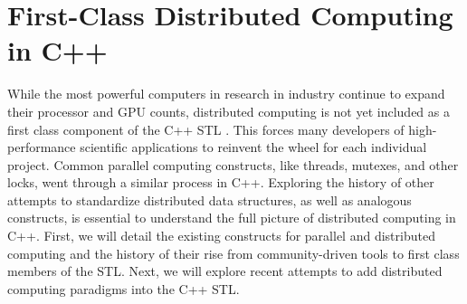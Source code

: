 \section{First-Class Distributed Computing in C++}
While the most powerful computers in research in industry continue to expand their processor and GPU counts,
distributed computing is not yet included as a first class component of the C++ STL \cite{towards_dist_cpp}. This forces many developers of high-performance scientific applications to reinvent the wheel for each individual project.  Common parallel computing constructs, like threads, mutexes, and other locks, went through a similar process in C++. Exploring the history of other attempts to standardize distributed data structures, as well as analogous constructs, is essential to understand the full picture of distributed computing in C++. First, we will detail the existing constructs for parallel and distributed computing and the history of their rise from community-driven tools to first class members of the STL. Next, we will explore recent attempts to add distributed computing paradigms into the C++ STL. 

